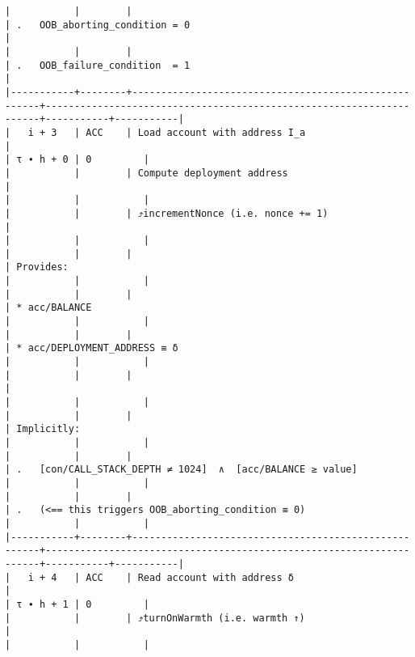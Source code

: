\documentclass[varwidth=\maxdimen,margin=0.5cm,multi={verbatim}]{standalone}
\begin{document}
\begin{verbatim}
|           |        |                                                      | .   OOB_aborting_condition = 0                                      |
|           |        |                                                      | .   OOB_failure_condition  = 1                                      |
|-----------+--------+------------------------------------------------------+---------------------------------------------------------------------+-----------+-----------|
|   i + 3   | ACC    | Load account with address I_a                        |                                                                     | τ ∙ h + 0 | 0         |
|           |        | Compute deployment address                           |                                                                     |           |           |
|           |        | ⤴️incrementNonce (i.e. nonce += 1)                   |                                                                     |           |           |
|           |        |                                                      | Provides:                                                           |           |           |
|           |        |                                                      | * acc/BALANCE                                                       |           |           |
|           |        |                                                      | * acc/DEPLOYMENT_ADDRESS ≡ δ                                        |           |           |
|           |        |                                                      |                                                                     |           |           |
|           |        |                                                      | Implicitly:                                                         |           |           |
|           |        |                                                      | .   [con/CALL_STACK_DEPTH ≠ 1024]  ∧  [acc/BALANCE ≥ value]         |           |           |
|           |        |                                                      | .   (<== this triggers OOB_aborting_condition ≡ 0)                  |           |           |
|-----------+--------+------------------------------------------------------+---------------------------------------------------------------------+-----------+-----------|
|   i + 4   | ACC    | Read account with address δ                          |                                                                     | τ ∙ h + 1 | 0         |
|           |        | ⤴️turnOnWarmth (i.e. warmth ↑)                       |                                                                     |           |           |

\end{verbatim}
\end{document}
